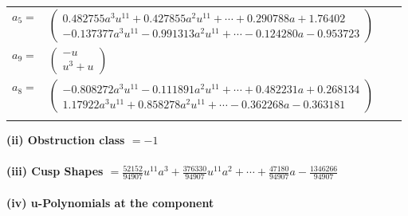 \documentclass[1p]{elsarticle_modified}
\theoremstyle{definition}
\begin{document}
\begin{tabular}{m{7pt} m{180pt} m{7pt} m{180pt} }
\flushright $a_{5}=$&$\begin{pmatrix}0.482755 a^{3} u^{11}+0.427855 a^{2} u^{11}+\cdots+0.290788 a+1.76402\\-0.137377 a^{3} u^{11}-0.991313 a^{2} u^{11}+\cdots-0.124280 a-0.953723\end{pmatrix}$ \\
\flushright $a_{9}=$&$\begin{pmatrix}- u\\u^3+u\end{pmatrix}$ \\
\flushright $a_{8}=$&$\begin{pmatrix}-0.808272 a^{3} u^{11}-0.111891 a^{2} u^{11}+\cdots+0.482231 a+0.268134\\1.17922 a^{3} u^{11}+0.858278 a^{2} u^{11}+\cdots-0.362268 a-0.363181\end{pmatrix}$\\&\end{tabular}
\flushleft \textbf{(ii) Obstruction class $= -1$}\\~\\
\flushleft \textbf{(iii) Cusp Shapes $= \frac{52152}{94907} u^{11} a^3+\frac{376330}{94907} u^{11} a^2+\cdots+\frac{47180}{94907} a-\frac{1346266}{94907}$}\\~\\
\newpage\renewcommand{\arraystretch}{1}
\flushleft \textbf{(iv) u-Polynomials at the component}\newline \\
\end{document}
